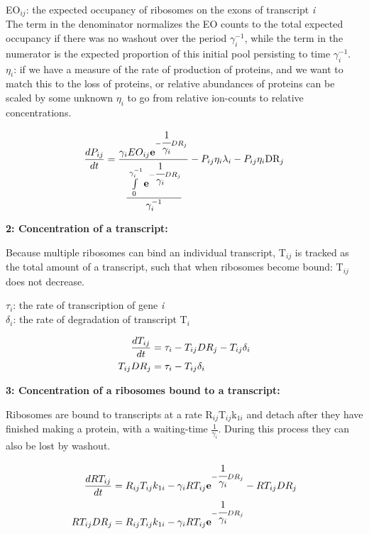 \documentclass[12pt]{article}
\begin{document}
EO$_{ij}$: the expected occupancy of ribosomes on the exons of transcript \textit{i}\\
The term in the denominator normalizes the EO counts to the total expected occupancy if there was no washout over the period $\gamma_{i}^{-1}$, while the term in the numerator is the expected proportion of this initial pool persisting to time $\gamma_{i}^{-1}$.\\
$\eta_{i}$: if we have a measure of the rate of production of proteins, and we want to match this to the loss of proteins, or relative abundances of proteins can be scaled by some unknown $\eta_{i}$ to go from relative ion-counts to relative concentrations.

\begin{align}
\frac{dP_{ij}}{dt} &= \frac{\gamma_{i}EO_{ij}\textbf{e}^{-\cfrac{1}{\gamma_{i}}DR_{j}}}{\cfrac{\int\limits_{0}^{\gamma_{i}^{-1}}\textbf{e}^{-\cfrac{1}{\gamma_{i}}DR_{j}}}{\gamma_{i}^{-1}}} - P_{ij}\eta_{i}\lambda_{i} - P_{ij}\eta_{i}\text{DR}_{j}\notag\\
\end{align}



\textbf{2: Concentration of a transcript:}

Because multiple ribosomes can bind an individual transcript, T$_{ij}$ is tracked as the total amount of a transcript, such that when ribosomes become bound: T$_{ij}$ does not decrease.

$\tau_{i}$: the rate of transcription of gene \textit{i}\\
$\delta_{i}$: the rate of degradation of transcript T$_{i}$

\begin{align}
\frac{dT_{ij}}{dt} &= \tau_{i} - T_{ij}DR_{j} - T_{ij}\delta_{i}\notag\\
T_{ij}DR_{j} &= \tau_{i} - T_{ij}\delta_{i}\label{trans}
\end{align}

\vspace{2cm}
\textbf{3: Concentration of a ribosomes bound to a transcript:}

Ribosomes are bound to transcripts at a rate R$_{ij}$T$_{ij}$k$_{1i}$ and detach after they have finished making a protein, with a waiting-time $\frac{1}{\gamma_{i}}$.  During this process they can also be lost by washout.

\begin{align}
\frac{dRT_{ij}}{dt} &= R_{ij}T_{ij}k_{1i} - \gamma_{i}RT_{ij}\textbf{e}^{-\cfrac{1}{\gamma_{i}}DR_{j}} - RT_{ij}DR_{j}\notag\\
RT_{ij}DR_{j} &= R_{ij}T_{ij}k_{1i} - \gamma_{i}RT_{ij}\textbf{e}^{-\cfrac{1}{\gamma_{i}}DR_{j}}\label{riboP}
\end{align}
\end{document}
